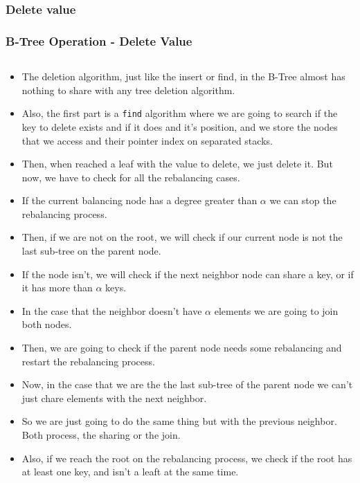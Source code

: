 \documentclass{beamer}
\begin{document}
\begin{frame}
    \subsubsection{Delete value}
    \frametitle{B-Tree Operation - Delete Value}
    \begin{columns}
        \begin{column}{\textlecolumn}
            \begin{block}{}
                \begin{itemize}
                    \item The deletion algorithm, just like the insert or find, in the B-Tree almost has nothing to share with any tree deletion algorithm.
                    \item Also, the first part is a \lstinline|find| algorithm where we are going to search if the key to delete exists and if it does
                        and it's position, and we store the nodes that we access and their pointer index on separated stacks.
                    \item Then, when reached a leaf with the value to delete, we just delete it. But now, we have to check 
                        for all the rebalancing cases.
                    \item If the current balancing node has a degree greater than \(\alpha\) we can stop the rebalancing process.
                    \item Then, if we are not on the root, we will check if our current node is not the last sub-tree on the parent node.
                    \item If the node isn't, we will check if the next neighbor node can share a key, or if it has more than \(\alpha\) keys.
                    \item In the case that the neighbor doesn't have \(\alpha\) elements we are going to join both nodes.
                    \item Then, we are going to check if the parent node needs some rebalancing and restart the rebalancing process.
                    \item Now, in the case that we are the the last sub-tree of the parent node we can't just chare elements with the next neighbor.
                    \item So we are just going to do the same thing but with the previous neighbor. Both process, the sharing or the join.
                    \item Also, if we reach the root on the rebalancing process, we check if the root has at least one key, and isn't a leaft at the same time.

\end{itemize}
\end{block}
\end{column}
\end{columns}
\end{frame}
\end{document}
